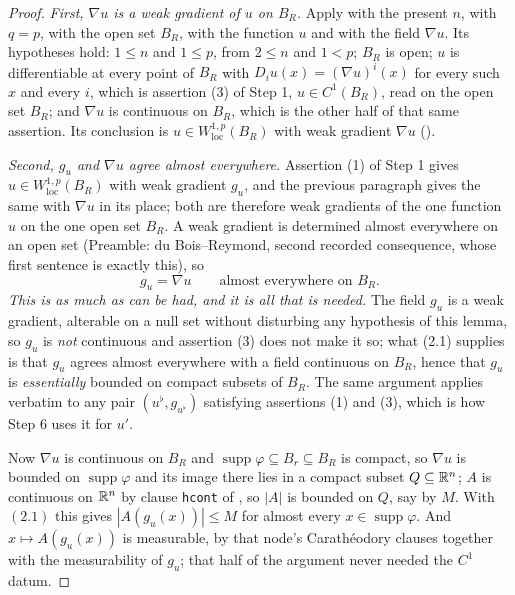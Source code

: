 \begin{proof}
\emph{First, $\nabla u$ is a weak gradient of $u$ on $B_R$.}  Apply
 with the present $n$, with $q=p$, with the open set
$B_R$, with the function $u$ and with the field $\nabla u$.  Its hypotheses
hold: $1\le n$ and $1\le p$, from $2\le n$ and $1<p$; $B_R$ is open; $u$ is
differentiable at every point of $B_R$ with $D_iu(x)=(\nabla u)^i(x)$ for every
such $x$ and every $i$, which is assertion (3) of Step 1, $u\in C^1(B_R)$, read
on the open set $B_R$; and $\nabla u$ is continuous on $B_R$, which is the other
half of that same assertion.  Its conclusion is
$u\in W^{1,p}_{\mathrm{loc}}(B_R)$ with weak gradient $\nabla u$
().

\emph{Second, $g_u$ and $\nabla u$ agree almost everywhere.}  Assertion (1) of
Step 1 gives $u\in W^{1,p}_{\mathrm{loc}}(B_R)$ with weak gradient $g_u$, and
the previous paragraph gives the same with $\nabla u$ in its place; both are
therefore weak gradients of the one function $u$ on the one open set $B_R$.  A
weak gradient is determined almost everywhere on an open set (Preamble: du
Bois--Reymond, second recorded consequence, whose first sentence is exactly
this), so
\[
g_u=\nabla u\qquad\text{almost everywhere on }B_R .
\tag{2.1}
\]
\emph{This is as much as can be had, and it is all that is needed.}  The field
$g_u$ is a weak gradient, alterable on a null set without disturbing any
hypothesis of this lemma, so $g_u$ is \emph{not} continuous and assertion (3)
does not make it so; what (2.1) supplies is that $g_u$ agrees almost everywhere
with a field continuous on $B_R$, hence that $g_u$ is \emph{essentially}
bounded on compact subsets of $B_R$.  The same argument applies verbatim to any
pair $(u^\flat,g_{u^\flat})$ satisfying assertions (1) and (3), which is how
Step 6 uses it for $u'$.

Now $\nabla u$ is continuous on $B_R$ and
$\operatorname{supp}\varphi\subseteq B_r\subseteq B_R$ is compact, so $\nabla u$
is bounded on $\operatorname{supp}\varphi$ and its image there lies in a compact
subset $Q\subseteq\mathbb{R}^n$; $A$ is continuous on $\mathbb{R}^n$ by clause \texttt{hcont} of
, so $|A|$ is bounded on $Q$, say by $M$.  With
$(2.1)$ this gives $|A(g_u(x))|\le M$ for almost every
$x\in\operatorname{supp}\varphi$.  And $x\mapsto A(g_u(x))$ is measurable, by
that node's Carath\'eodory clauses together with the measurability of $g_u$;
that half of the argument never needed the $C^1$ datum.


\end{proof}
